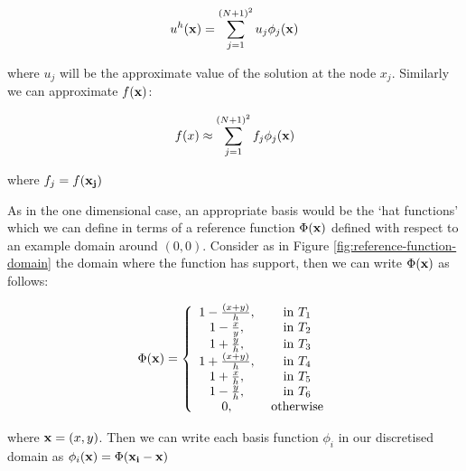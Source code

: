 \begin{equation}
	u^h(\mathbf{x}) = \sum_{j=1}^{(N+1)^2}u_j\phi_j(\mathbf{x})
\end{equation}

where $u_j$ will be the approximate value of the solution at the node $x_j$. Similarly we can
approximate $f(\mathbf{x})$:

\begin{equation}
	f(x) \approx \sum_{j=1}^{(N+1)^2}f_j\phi_j(\mathbf{x})
\end{equation}

where $f_j = f(\mathbf{x_j})$


As in the one dimensional case, an appropriate basis would be the `hat functions' which we can define in
terms of a reference function $\Phi(\mathbf{x})$ defined with respect to an example domain around $(0,0)$.
Consider as in Figure \ref{fig:reference-function-domain} the domain where the function has support, 
then we can write $\Phi(\mathbf{x})$ as follows:

\begin{equation}\label{eq:two-d-ref-basis-fn}
	\Phi(\mathbf{x}) = \left\{\begin{array}{c c}
					1 - \frac{(x + y)}{h}, & \text{ in } T_1 \\
                    1 - \frac{x}{y},       & \text{ in } T_2 \\
                    1 + \frac{y}{h},       & \text{ in } T_3 \\
                    1 + \frac{(x + y)}{h}, & \text{ in } T_4 \\
                    1 + \frac{x}{h},       & \text{ in } T_5 \\
                    1 - \frac{y}{h},       & \text{ in } T_6 \\
                    0,                     & \text{ otherwise}
 	              \end{array}\right.
\end{equation}

where $\mathbf{x} = (x, y)$. Then we can write each basis function $\phi_i$ in our discretised domain as
$\phi_i(\mathbf{x}) = \Phi(\mathbf{x_i} - \mathbf{x})$

